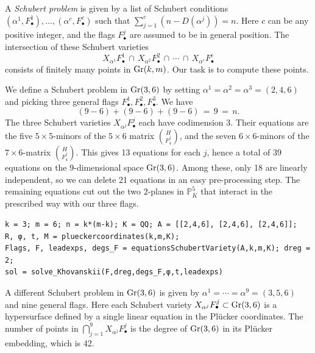 \documentclass[12pt]{article}
\theoremstyle{definition}
\newenvironment{example}
  {\pushQED{\qed}\renewcommand{\qedsymbol}{$\diamond$}\examplex}
  {\popQED\endexamplex}
\theoremstyle{remark}
\begin{document}
A \emph{Schubert problem} is given by a list of Schubert conditions $(\alpha^1, F^1_\bullet),\dots,(\alpha^c, F^c_\bullet)$ such that $\sum_{j=1}^c (n-D(\alpha^j))=n$. Here $c$ can be any positive integer, and the flags $F^j_\bullet$ are assumed to be in general position. The intersection of these Schubert varieties 
\begin{equation} \label{Schuber variety}
    X_{\alpha^1}F^1_\bullet \, \cap \,  X_{\alpha^2}F^2_\bullet \, \cap \, \cdots \, \cap \,  X_{\alpha^c}F^c_\bullet
\end{equation}
consists of finitely many points in ${\rm Gr}(k,m)$. Our task is to compute these points. 

\begin{example}[$k=3, m = 6$] \label{ex Schubert calculus}
    We define a Schubert problem in ${\rm Gr}(3,6)$ by setting $\alpha^1 = \alpha^2 = \alpha^3 =(2,4,6)$ and picking three general flags $F^1_\bullet, F^2_\bullet, F^3_\bullet$. We have 
    \[ (9-6) + (9-6) + (9-6) \, = \, 9 \, = \, n. \]
The three Schubert varieties $X_{\alpha^j}F^j_\bullet $ each have codimension $3$. Their equations are the five $5 \times 5$-minors of the $5 \times 6$ matrix $\binom{H}{F^j_4}$, and 
the seven $6 \times 6$-minors of the $7 \times 6$-matrix $\binom{H}{F^j_4}$. 
This gives 13 equations for each $j$, hence a total of 39  equations on the $9$-dimensional space ${\rm Gr}(3,6)$. Among these, only 18 are linearly independent, so we can delete 21 equations in an easy pre-processing step. The remaining equations cut out the two $2$-planes in $\mathbb{P}_{\overline{K}}^{5}$ that interact in the prescribed way with our three flags.
\begin{verbatim}
k = 3; m = 6; n = k*(m-k); K = QQ; A = [[2,4,6], [2,4,6], [2,4,6]];
R, φ, t, M = plueckercoordinates(k,m,K);
Flags, F, leadexps, degs_F = equationsSchubertVariety(A,k,m,K); dreg = 2;
sol = solve_Khovanskii(F,dreg,degs_F,φ,t,leadexps)
\end{verbatim}
A different Schubert problem in ${\rm Gr}(3,6)$ is given by $\alpha^1 = \cdots = \alpha^9 = (3,5,6)$ and nine general flags. Here each Schubert variety $X_{\alpha^j}F^j_\bullet \subset {\rm Gr}(3,6)$ is a hypersurface defined by a single linear equation in the Pl\"ucker coordinates. The number of points in $\bigcap_{j = 1}^9 X_{\alpha^j} F^j_\bullet$ is the degree of ${\rm Gr}(3,6)$ in its Pl\"ucker embedding, which is 42.


\end{example}
\end{document}

